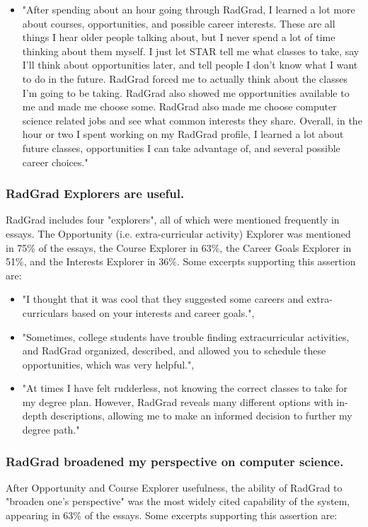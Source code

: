 \documentclass[acmsmall]{acmart}
\begin{document}
\begin{itemize}[leftmargin=*]
\item "After spending about an hour going through RadGrad, I learned a lot more about courses, opportunities, and possible career interests. These are all things I hear older people talking about, but I never spend a lot of time thinking about them myself. I just let STAR tell me what classes to take, say I’ll think about opportunities later, and tell people I don’t know what I want to do in the future. RadGrad forced me to actually think about the classes I’m going to be taking. RadGrad also showed me opportunities available to me and made me choose some. RadGrad also made me choose computer science related jobs and see what common interests they share. Overall, in the hour or two I spent working on my RadGrad profile, I learned a lot about future classes, opportunities I can take advantage of, and several possible career choices."
\end{itemize}

\subsubsection{RadGrad Explorers are useful.} RadGrad includes four "explorers", all of which were mentioned frequently in essays. The Opportunity (i.e. extra-curricular activity) Explorer was mentioned in 75\% of the essays, the Course Explorer in 63\%, the Career Goals Explorer in 51\%, and the Interests Explorer in 36\%. Some excerpts supporting this assertion are:

\begin{itemize}[leftmargin=*]
\item "I thought that it was cool that they suggested some careers and extra-curriculars based on your interests and career goals.",
\item "Sometimes, college students have trouble finding extracurricular activities, and RadGrad organized, described, and allowed you to schedule these opportunities, which was very helpful.",
\item "At times I have felt rudderless, not knowing the correct classes to take for my degree plan. However, RadGrad reveals many different options with in-depth descriptions, allowing me to make an informed decision to further my degree path."
\end{itemize}

\subsubsection{RadGrad broadened my perspective on computer science.} After Opportunity and Course Explorer usefulness, the ability of RadGrad to "broaden one's perspective" was the most widely cited capability of the system, appearing in 63\% of the essays. Some excerpts supporting this assertion are:
\end{document}
